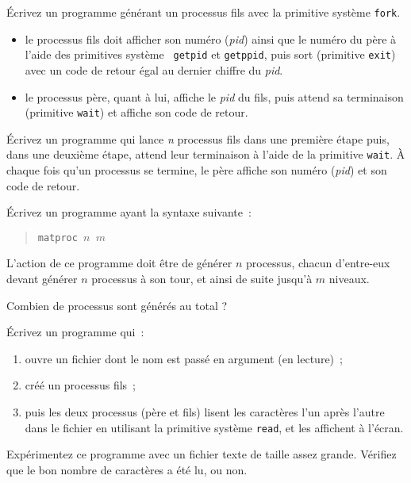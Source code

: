 %


% 


\question

Écrivez un programme générant un processus fils avec la primitive
système {\tt fork}.

\begin {itemize}
    \item le processus fils doit afficher son numéro ({\em pid}) ainsi
	que le numéro du père à l'aide des primitives système {\tt
	getpid} et {\tt getppid}, puis sort (primitive {\tt exit}) avec
	un code de retour égal au dernier chiffre du {\em pid}.

    \item le processus père, quant à lui, affiche le {\em pid} du fils,
	puis attend sa terminaison (primitive {\tt wait}) et affiche son
	code de retour.

\end {itemize}


\question

Écrivez un programme qui lance {\em n} processus fils dans une
première étape puis, dans une deuxième étape, attend leur terminaison
à l'aide de la primitive {\tt wait}.
\`A chaque fois qu'un processus se termine,
le père affiche son numéro ({\em pid}) et son code de retour.


\question

Écrivez un programme ayant la syntaxe suivante~:

\vspace* {-3mm}
\begin {quote}
{\tt matproc $n$ $m$}
\end {quote}

L'action de ce programme doit être de générer $n$ processus, chacun
d'entre-eux devant générer $n$ processus à son tour, et ainsi de suite
jusqu'à $m$ niveaux.

Combien de processus sont générés au total ?

\question

Écrivez un programme qui~:
\begin {enumerate}
	\item ouvre un fichier dont le nom est passé en argument (en
	lecture)~;
	\item créé un processus fils~;
	\item puis les deux processus (père et fils) lisent les caractères
	l'un après l'autre dans le fichier en utilisant la primitive système
	{\tt read}, et les affichent à l'écran.
\end {enumerate}
Expérimentez ce programme avec un fichier texte de taille assez grande.
Vérifiez que le bon nombre de caractères a été lu, ou non.

